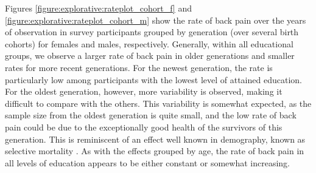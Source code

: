 Figures \ref{figure:explorative:rateplot_cohort_f} and \ref{figure:explorative:rateplot_cohort_m} show the rate of back pain over the years of observation in survey participants grouped by generation (over several birth cohorts) for females and males, respectively. Generally, within all educational groups, we observe a larger rate of back pain in older generations and smaller rates for more recent generations. For the newest generation, the rate is particularly low among participants with the lowest level of attained education. For the oldest generation, however, more variability is observed, making it difficult to compare with the others. This variability is somewhat expected, as the sample size from the oldest generation is quite small, and the low rate of back pain could be due to the exceptionally good health of the survivors of this generation. This is reminiscent of an effect well known in demography, known as selective mortality \citep{beckett2000converging, house1990age, lynch2003cohort}. As with the effects grouped by age, the rate of back pain in all levels of education appears to be either constant or somewhat increasing. 


